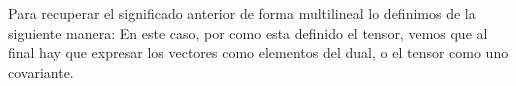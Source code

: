 Para recuperar el significado anterior de forma multilineal lo definimos de la siguiente manera:
En este caso, por como esta definido el tensor, vemos que al final hay que expresar los vectores como elementos del dual, o el tensor como uno covariante.